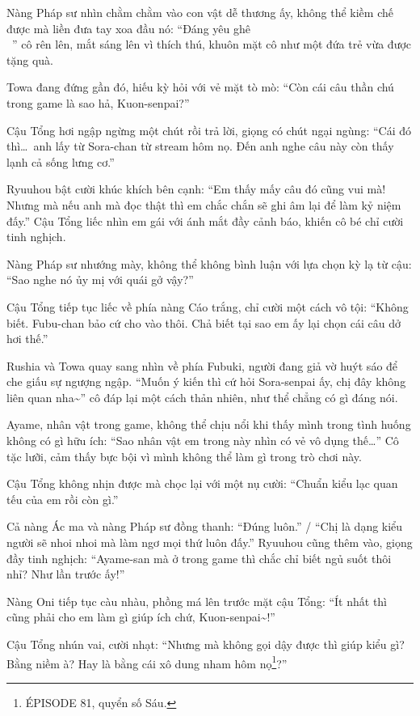 \documentclass[../main.tex]{subfiles}
\begin{document}
Nàng Pháp sư nhìn chằm chằm vào con vật dễ thương ấy, không thể kiềm chế được mà liền đưa tay xoa đầu nó: ``Đáng yêu ghê\\~{}'' cô rên lên, mắt sáng lên vì thích thú, khuôn mặt cô như một đứa trẻ vừa được tặng quà.

Towa đang đứng gần đó, hiếu kỳ hỏi với vẻ mặt tò mò: ``Còn cái câu thần chú trong game là sao hả, Kuon-senpai?''

Cậu Tổng hơi ngập ngừng một chút rồi trả lời, giọng có chút ngại ngùng: ``Cái đó thì\dots\ anh lấy từ Sora-chan từ stream hôm nọ. Đến anh nghe câu này còn thấy lạnh cả sống lưng cơ.''

Ryuuhou bật cười khúc khích bên cạnh: ``Em thấy mấy câu đó cũng vui mà! Nhưng mà nếu anh mà đọc thật thì em chắc chắn sẽ ghi âm lại để làm kỷ niệm đấy.'' Cậu Tổng liếc nhìn em gái với ánh mắt đầy cảnh báo, khiến cô bé chỉ cười tinh nghịch.

Nàng Pháp sư nhướng mày, không thể không bình luận với lựa chọn kỳ lạ từ cậu: ``Sao nghe nó ủy mị với quái gở vậy?''

Cậu Tổng tiếp tục liếc về phía nàng Cáo trắng, chỉ cười một cách vô tội: ``Không biết. Fubu-chan bảo cứ cho vào thôi. Chả biết tại sao em ấy lại chọn cái câu dở hơi thế.''

Rushia và Towa quay sang nhìn về phía Fubuki, người đang giả vờ huýt sáo để che giấu sự ngượng ngập. ``Muốn ý kiến thì cứ hỏi Sora-senpai ấy, chị đây không liên quan nha\~{}'' cô đáp lại một cách thản nhiên, như thể chẳng có gì đáng nói.

Ayame, nhân vật trong game, không thể chịu nổi khi thấy mình trong tình huống không có gì hữu ích: ``Sao nhân vật em trong này nhìn có vẻ vô dụng thế\dots'' Cô tặc lưỡi, cảm thấy bực bội vì mình không thể làm gì trong trò chơi này.

Cậu Tổng không nhịn được mà chọc lại với một nụ cười: ``Chuẩn kiểu lạc quan tếu của em rồi còn gì.''

Cả nàng Ác ma và nàng Pháp sư đồng thanh: ``Đúng luôn.'' / ``Chị là dạng kiểu người sẽ nhoi nhoi mà làm ngơ mọi thứ luôn đấy.'' Ryuuhou cũng thêm vào, giọng đầy tinh nghịch: ``Ayame-san mà ở trong game thì chắc chỉ biết ngủ suốt thôi nhỉ? Như lần trước ấy!''

Nàng Oni tiếp tục càu nhàu, phồng má lên trước mặt cậu Tổng: ``Ít nhất thì cũng phải cho em làm gì giúp ích chứ, Kuon-senpai\~{}!''

Cậu Tổng nhún vai, cười nhạt: ``Nhưng mà không gọi dậy được thì giúp kiểu gì? Bằng niềm à? Hay là bằng cái xô dung nham hôm nọ\footnote{{\flaregothic ÉPISODE 81}, quyển số Sáu.}?''
\end{document}
